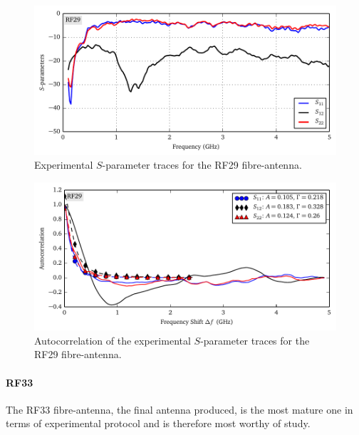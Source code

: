 \begin{figure}
 \centering
 \includegraphics{figs/active/RF29-sParameters.pdf}
 \caption[Experimental $S$-parameter traces for the RF29 fibre-antenna]
 		{Experimental $S$-parameter traces for the RF29 fibre-antenna.}
 \label{fig:active.lcx.rf29sParameters}
\end{figure}

\begin{figure}
 \centering
 \includegraphics{figs/active/RF29-autoCorrelation.pdf}
 \caption[Autocorrelation of the experimental $S$-parameter traces for the RF29 fibre-antenna]
 		{Autocorrelation of the experimental $S$-parameter traces for the RF29 fibre-antenna.}
 \label{fig:active.lcx.rf29autocorrelation}
\end{figure}

\paragraph{RF33}
The RF33 fibre-antenna, the final antenna produced, is the most mature
one in terms of experimental protocol and is therefore most
worthy of study. 


